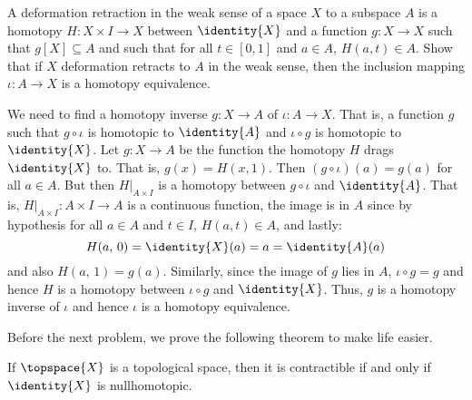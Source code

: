 \documentclass{book}                                                           %
\begin{document}
\begin{problem}
    A deformation retraction in the weak sense of a space $X$ to a subspace
    $A$ is a homotopy $H:X\times{I}\rightarrow{X}$ between $\identity{X}$
    and a function $g:X\rightarrow{X}$ such that $g[X]\subseteq{A}$ and
    such that for all $t\in[0,1]$ and $a\in{A}$, $H(a,t)\in{A}$. Show that
    if $X$ deformation retracts to $A$ in the weak sense, then the
    inclusion mapping $\iota:A\rightarrow{X}$ is a homotopy equivalence.
\end{problem}
\begin{solution}
    We need to find a homotopy inverse $g:X\rightarrow{A}$ of
    $\iota:A\rightarrow{X}$. That is, a function $g$ such that
    $g\circ\iota$ is homotopic to $\identity{A}$ and $\iota\circ{g}$ is
    homotopic to $\identity{X}$. Let $g:X\rightarrow{A}$ be the function
    the homotopy $H$ drags $\identity{X}$ to. That is, $g(x)=H(x,1)$.
    Then $(g\circ\iota)(a)=g(a)$ for all $a\in{A}$. But then
    $H|_{A\times{I}}$ is a homotopy between $g\circ\iota$ and
    $\identity{A}$. That is, $H|_{A\times{I}}:A\times{I}\rightarrow{A}$ is
    a continuous function, the image is in $A$ since by hypothesis for all
    $a\in{A}$ and $t\in{I}$, $H(a,t)\in{A}$, and lastly:
    \begin{equation}
        H(a,\,0)=\identity{X}(a)=a=\identity{A}(a)
    \end{equation}
    and also $H(a,\,1)=g(a)$. Similarly, since the image of $g$ lies in $A$,
    $\iota\circ{g}=g$ and hence $H$ is a homotopy between
    $\iota\circ{g}$ and $\identity{X}$. Thus, $g$ is a homotopy inverse of
    $\iota$ and hence $\iota$ is a homotopy equivalence.
\end{solution}
Before the next problem, we prove the following theorem to make life easier.
\begin{theorem}
    If $\topspace{X}$ is a topological space, then it is
    contractible if and only if $\identity{X}$ is nullhomotopic.
\end{theorem}
\end{document}
